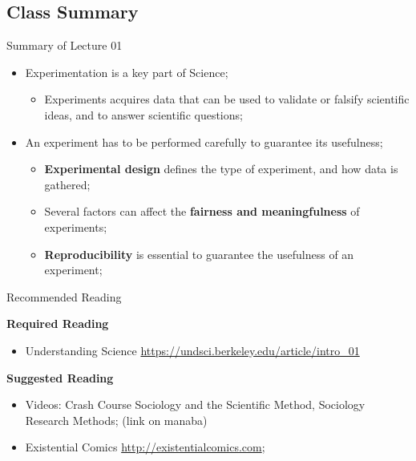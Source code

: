 \documentclass[aspectratio=169]{beamer}
\begin{document}
\subsection{Class Summary}
\begin{frame}{Summary of Lecture 01}
  \begin{itemize}
    \item Experimentation is a key part of Science;
    \begin{itemize}
      \item Experiments acquires data that can be used to validate or falsify scientific ideas, and to answer scientific questions;
    \end{itemize}
    \bigskip

    \item An experiment has to be performed carefully to guarantee its usefulness;
    \begin{itemize}
      \item {\bf Experimental design} defines the type of experiment, and how data is gathered;
      \item Several factors can affect the {\bf fairness and meaningfulness} of experiments;
      \item {\bf Reproducibility} is essential to guarantee the usefulness of an experiment;
    \end{itemize}
  \end{itemize}

\end{frame}

\begin{frame}{Recommended Reading}

  {\bf Required Reading}
  \begin{itemize}
    \item Understanding Science \url{https://undsci.berkeley.edu/article/intro_01}
  \end{itemize}
  \bigskip

  {\bf Suggested Reading}
  \begin{itemize}
    \item Videos: Crash Course Sociology and the Scientific Method, Sociology Research Methods; (link on manaba)
    \item Existential Comics \url{http://existentialcomics.com};
  \end{itemize}
\end{frame}





\end{document}
